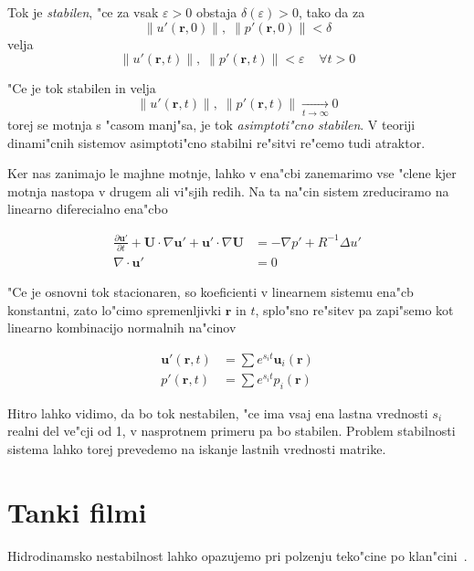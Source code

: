 \documentclass[a4paper,10pt]{article}
\renewcommand{\vec}{\mathbf}
\newcommand{\eps}{\varepsilon}
\newcommand{\norm}[1]{\lVert #1 \rVert}
\newcommand{\rt}{(\vec r, t)}
\begin{document}
Tok je \emph{stabilen}, "ce za vsak $\eps > 0$ obstaja $\delta(\eps) > 0$, tako da za 
\begin{equation}
 \norm{ u'(\vec r, 0) }, \; \norm{ p'(\vec r, 0) } < \delta
\end{equation}
velja
\begin{equation}
 \norm{ u'\rt }, \; \norm{ p'\rt } < \eps \;\;\;\; \forall t > 0
\end{equation}

"Ce je tok stabilen in velja
\begin{equation}
 \norm{u'\rt}, \; \norm{p'\rt} \xrightarrow[t\to\infty]{} 0
\end{equation}
torej se motnja s "casom manj"sa, je tok \emph{asimptoti"cno stabilen}. V teoriji dinami"cnih sistemov asimptoti"cno stabilni re"sitvi re"cemo tudi atraktor. 

Ker nas zanimajo le majhne motnje, lahko v ena"cbi zanemarimo vse "clene kjer motnja nastopa v drugem ali vi"sjih redih. Na ta na"cin sistem zreduciramo na linearno diferecialno ena"cbo 

\begin{align}
 \label{eq:ns-linearna}
\frac{\partial \vec u'}{\partial t} + \vec U \cdot \nabla \vec u' + \vec u' \cdot \nabla \vec U &= -\nabla p' + R^{-1}\Delta u' \\
\label{eq:nestisljivost-linearna}
\nabla \cdot \vec u' &= 0
\end{align}

"Ce je osnovni tok stacionaren, so koeficienti v linearnem sistemu ena"cb konstantni, zato lo"cimo spremenljivki $\vec r$ in $t$, splo"sno re"sitev pa zapi"semo kot linearno kombinacijo normalnih na"cinov 

\begin{align}
 \vec u'\rt &= \sum e^{s_i t} \vec u_i(\vec r) \\
 p'\rt &= \sum e^{s_i t} p_i(\vec r)
\end{align}

Hitro lahko vidimo, da bo tok nestabilen, "ce ima vsaj ena lastna vrednosti $s_i$ realni del ve"cji od 1, v nasprotnem primeru pa bo stabilen. Problem stabilnosti sistema lahko torej prevedemo na iskanje lastnih vrednosti matrike. 

\section{Tanki filmi}

Hidrodinamsko nestabilnost lahko opazujemo pri polzenju teko"cine po klan"cini~\cite{kondic}. 
\end{document}
